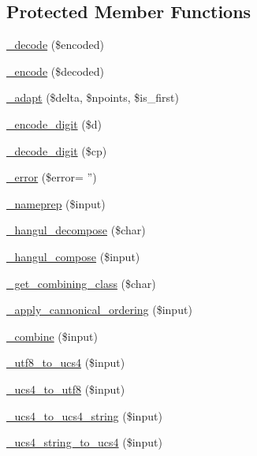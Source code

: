 \subsection*{Protected Member Functions}
\begin{DoxyCompactItemize}
\item 
\hyperlink{classidna__convert_a6e4c2f051cfd4ebd84d47c013c18205e}{\-\_\-decode} (\$encoded)
\item 
\hyperlink{classidna__convert_aa32f14e1635b5bcf8a1000721a53db8d}{\-\_\-encode} (\$decoded)
\item 
\hyperlink{classidna__convert_a521d4543ec6839af3283be4380e91a86}{\-\_\-adapt} (\$delta, \$npoints, \$is\-\_\-first)
\item 
\hyperlink{classidna__convert_afdb30c72ac13c3c71922afb63fabb37c}{\-\_\-encode\-\_\-digit} (\$d)
\item 
\hyperlink{classidna__convert_adb87b0a6d3168899e718dff394723e96}{\-\_\-decode\-\_\-digit} (\$cp)
\item 
\hyperlink{classidna__convert_a16cb93864021e29871b9ad6716ab632c}{\-\_\-error} (\$error= '')
\item 
\hyperlink{classidna__convert_ac73124acc2f1e772fadd64d176bfe0b9}{\-\_\-nameprep} (\$input)
\item 
\hyperlink{classidna__convert_a9cc5a89053729bb98d2a0ecf143b2b2c}{\-\_\-hangul\-\_\-decompose} (\$char)
\item 
\hyperlink{classidna__convert_a33124ab535f6739a2a5e6fa46c532d28}{\-\_\-hangul\-\_\-compose} (\$input)
\item 
\hyperlink{classidna__convert_abd868ffb75c0d7633998ab14f6621dd3}{\-\_\-get\-\_\-combining\-\_\-class} (\$char)
\item 
\hyperlink{classidna__convert_a3e0f3eceeb2987f2b69b9a3cf6f7181a}{\-\_\-apply\-\_\-cannonical\-\_\-ordering} (\$input)
\item 
\hyperlink{classidna__convert_a751b0b8bfacdc3b79eb77018a508363d}{\-\_\-combine} (\$input)
\item 
\hyperlink{classidna__convert_abafc3eb23a9da5e7b53c5f9f8b7ee035}{\-\_\-utf8\-\_\-to\-\_\-ucs4} (\$input)
\item 
\hyperlink{classidna__convert_a3827709d9c0e35a164838064f73daea5}{\-\_\-ucs4\-\_\-to\-\_\-utf8} (\$input)
\item 
\hyperlink{classidna__convert_ac353a6fccbc4e8e15e90772acb6e2a74}{\-\_\-ucs4\-\_\-to\-\_\-ucs4\-\_\-string} (\$input)
\item 
\hyperlink{classidna__convert_ac95599caba5f1a276ba1a75a12d385dd}{\-\_\-ucs4\-\_\-string\-\_\-to\-\_\-ucs4} (\$input)
\end{DoxyCompactItemize}
